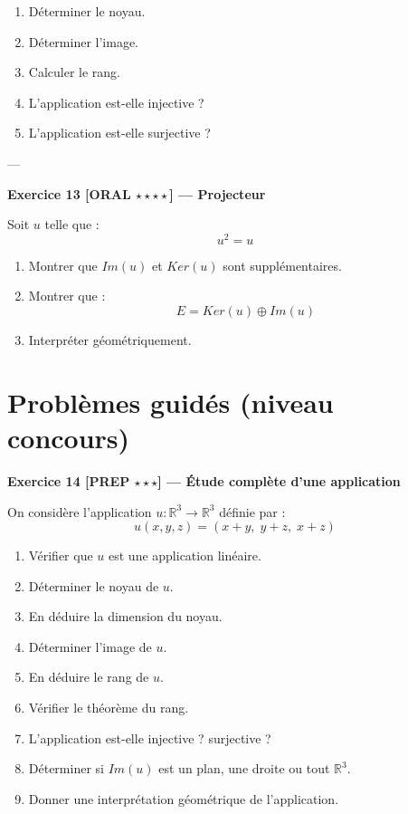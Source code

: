 \documentclass[11pt,a4paper]{article}
\begin{document}
\begin{enumerate}
\item Déterminer le noyau.
\item Déterminer l’image.
\item Calculer le rang.
\item L’application est-elle injective ?
\item L’application est-elle surjective ?
\end{enumerate}

---

\textbf{Exercice 13 [ORAL $\star\star\star\star$] — Projecteur}

Soit $u$ telle que :
\[
u^2 = u
\]

\begin{enumerate}
\item Montrer que $Im(u)$ et $Ker(u)$ sont supplémentaires.
\item Montrer que :
\[
E = Ker(u) \oplus Im(u)
\]
\item Interpréter géométriquement.
\end{enumerate}

\section{Problèmes guidés (niveau concours)}

\textbf{Exercice 14 [PREP $\star\star\star$] — Étude complète d’une application}

On considère l’application $u : \mathbb{R}^3 \to \mathbb{R}^3$ définie par :
\[
u(x,y,z) = (x+y,\; y+z,\; x+z)
\]

\begin{enumerate}
\item Vérifier que $u$ est une application linéaire.
\item Déterminer le noyau de $u$.
\item En déduire la dimension du noyau.
\item Déterminer l’image de $u$.
\item En déduire le rang de $u$.
\item Vérifier le théorème du rang.
\item L’application est-elle injective ? surjective ?
\item Déterminer si $Im(u)$ est un plan, une droite ou tout $\mathbb{R}^3$.
\item Donner une interprétation géométrique de l'application.
\end{enumerate}
\end{document}

